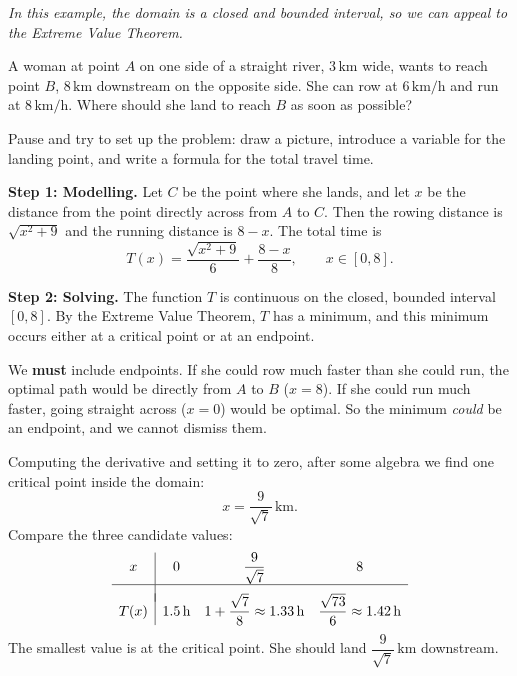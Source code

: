 \textit{In this example, the domain is a closed and bounded interval, so we can appeal to the Extreme Value Theorem.}

\begin{example}
\label{ex:6-4}
A woman at point $A$ on one side of a straight river, $3\,\text{km}$ wide, wants to reach point $B$, $8\,\text{km}$ downstream on the opposite side.  She can row at $6\,\text{km/h}$ and run at $8\,\text{km/h}$.  Where should she land to reach $B$ as soon as possible?
\end{example}

\begin{remark}
Pause and try to set up the problem: draw a picture, introduce a variable for the landing point, and write a formula for the total travel time.
\end{remark}

\textbf{Step 1: Modelling.}  Let $C$ be the point where she lands, and let $x$ be the distance from the point directly across from $A$ to $C$.  Then the rowing distance is $\sqrt{x^{2} + 9}$ and the running distance is $8 - x$.  The total time is
\[
  T(x) = \frac{\sqrt{x^{2} + 9}}{6} + \frac{8 - x}{8}, \qquad x \in [0, 8].
\]

\textbf{Step 2: Solving.}  The function $T$ is continuous on the closed, bounded interval $[0,8]$.  By the Extreme Value Theorem, $T$ has a minimum, and this minimum occurs either at a critical point or at an endpoint.

\begin{remark}
We \textbf{must} include endpoints.  If she could row much faster than she could run, the optimal path would be directly from $A$ to $B$ ($x = 8$).  If she could run much faster, going straight across ($x = 0$) would be optimal.  So the minimum \emph{could} be an endpoint, and we cannot dismiss them.
\end{remark}

Computing the derivative and setting it to zero, after some algebra we find one critical point inside the domain:
\[
  x = \frac{9}{\sqrt{7}}\,\text{km}.
\]
Compare the three candidate values:
\[
\begin{array}{c|ccc}
  x & 0 & \dfrac{9}{\sqrt{7}} & 8 \\[6pt] \hline \\[-6pt]
  T(x) & 1.5\,\text{h} & 1 + \dfrac{\sqrt{7}}{8} \approx 1.33\,\text{h} & \dfrac{\sqrt{73}}{6} \approx 1.42\,\text{h}
\end{array}
\]
The smallest value is at the critical point.  She should land $\dfrac{9}{\sqrt{7}}\,\text{km}$ downstream.

